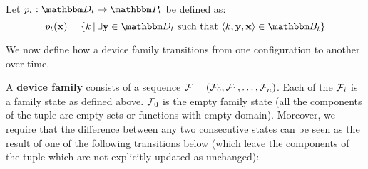 \begin{definition}
Let $\zpuks_t : \zset{d}_t \rightarrow \zset{p}_t$ be defined as:
\[
  \zpuks_t(\zdev{x}) = \left\{
  \zkey{k} \, | \,
\exists \zdev{y} \in \zset{d}_t \text{ such that }
 \langle \zkey{k}, \zdev{y}, \zdev{x} \rangle \in \zset{b}_t
\right\}
\]
\end{definition}

We now define how a device family transitions from one configuration to
another over time.

\begin{definition}
  \label{d:trans}
  A \textbf{device family} consists of a sequence $\mathcal{F} = (\mathcal{F}_0,\mathcal{F}_1,\dots,\mathcal{F}_n)$. Each of the $\mathcal{F}_i$ is a family state as defined above. $\mathcal{F}_0$ is the empty family state (all the components of the tuple are empty sets or functions with empty domain). Moreover, we require that the difference between any two consecutive states can be seen as the result of one of the following transitions below (which leave the components of the tuple which are not explicitly updated as unchanged):


\end{definition}

